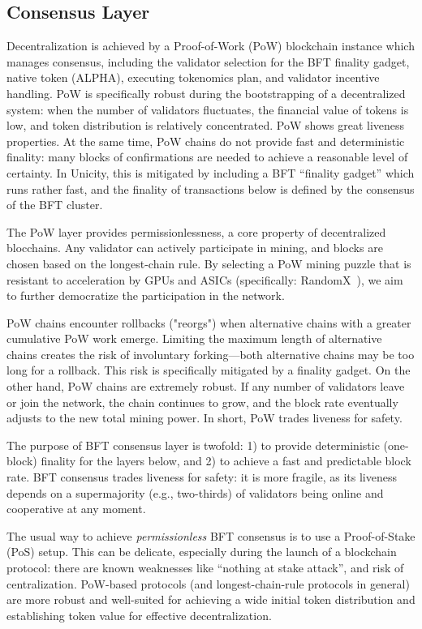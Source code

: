 \documentclass[twocolumn]{article}
\begin{document}
\subsection{Consensus Layer}
Decentralization is achieved by a Proof-of-Work (PoW) blockchain instance which manages consensus, including the validator selection for the BFT finality gadget, native token (ALPHA), executing tokenomics plan, and validator incentive handling. PoW is specifically robust during the bootstrapping of a decentralized system: when the number of validators fluctuates, the financial value of tokens is low, and token distribution is relatively concentrated. PoW shows great liveness properties. At the same time, PoW chains do not provide fast and deterministic finality: many blocks of confirmations are needed to achieve a reasonable level of certainty. In Unicity, this is mitigated by including a BFT ``finality gadget'' which runs rather fast, and the finality of transactions below is defined by the consensus of the BFT cluster.

The PoW layer provides permissionlessness, a core property of decentralized blocchains. Any validator can actively participate in mining, and blocks are chosen based on the longest-chain rule. By selecting a PoW mining puzzle that is resistant to acceleration by GPUs and ASICs (specifically: RandomX~\cite{ramdomx}), we aim to further democratize the participation in the network.

PoW chains encounter rollbacks ("reorgs") when alternative chains with a greater cumulative PoW work emerge. Limiting the maximum length of alternative chains creates the risk of involuntary forking---both alternative chains may be too long for a rollback. This risk is specifically mitigated by a finality gadget. On the other hand, PoW chains are extremely robust. If any number of validators leave or join the network, the chain continues to grow, and the block rate eventually adjusts to the new total mining power. In short, PoW trades liveness for safety.

The purpose of BFT consensus layer is twofold: 1) to provide deterministic (one-block) finality for the layers below, and 2) to achieve a fast and predictable block rate. BFT consensus trades liveness for safety: it is more fragile, as its liveness depends on a supermajority (e.g., two-thirds) of validators being online and cooperative at any moment.

The usual way to achieve \emph{permissionless} BFT consensus is to use a Proof-of-Stake (PoS) setup. This can be delicate, especially during the launch of a blockchain protocol: there are known weaknesses like ``nothing at stake attack'', and risk of centralization. PoW-based protocols (and longest-chain-rule protocols in general) are more robust and well-suited for achieving a wide initial token distribution and establishing token value for effective decentralization.
\end{document}
